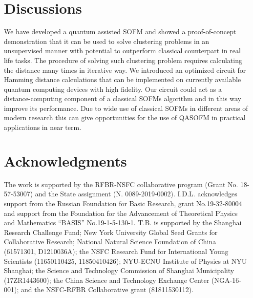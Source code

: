 \documentclass[pra,showkeys,twocolumn,showpacs]{revtex4-1}
\begin{document}
\section{Discussions}
We have developed a quantum assisted SOFM and showed a proof-of-concept demonstration that 
it can be used to solve clustering problems in an unsupervised manner with potential to outperform classical counterpart in real life tasks. 
The procedure of solving such clustering problem requires calculating the distance many times in iterative way. 
We introduced an optimized circuit for Hamming distance calculations that can be implemented on currently available quantum computing devices with high fidelity. 
Our circuit could act as a distance-computing component of a classical SOFMs algorithm and in this way improve its performance. 
Due to wide use of classical SOFMs in different areas of modern research this can give opportunities for the use of QASOFM in practical applications in near term.




\section*{Acknowledgments}
The work is supported by the RFBR-NSFC collaborative program (Grant No. 18-57-53007) and the State assignment (N. 0089-2019-0002). I.D.L. acknowledges support from the Russian Foundation for Basic Research, grant No.19-32-80004 and support from the Foundation for the Advancement of Theoretical Physics and Mathematics “BASIS” No.19-1-5-130-1. T.B. is supported by the Shanghai Research Challenge Fund; New York University Global Seed Grants for Collaborative Research; National Natural Science Foundation of China (61571301, D1210036A); the NSFC Research Fund for International Young Scientists (11650110425, 11850410426); NYU-ECNU Institute of Physics at NYU Shanghai; the Science and Technology Commission of Shanghai Municipality (17ZR1443600); the China Science and Technology Exchange Center (NGA-16-001); and the NSFC-RFBR Collaborative grant (81811530112).






\end{document}
